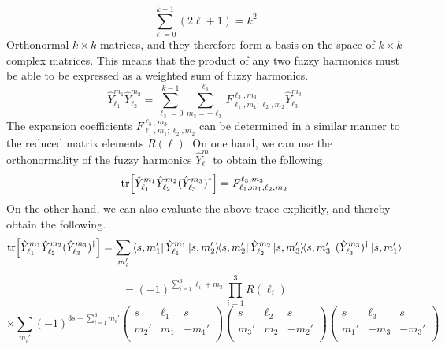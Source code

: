 %
%
\begin{equation}
\sum_{\ell=0}^{k-1} (2 \ell + 1) = k^2
\end{equation}
%
%
Orthonormal $k \times k$ matrices, and they therefore form a basis on the space of $k \times k$ complex matrices. This means that the product of any two fuzzy harmonics must be able to be expressed as a weighted sum of fuzzy harmonics.
%
%
\begin{equation}\label{fuzzy harmonic expansion}
\hat{Y}^{m_1}_{\ell_1}
\hat{Y}^{m_2}_{\ell_2}
=
\sum_{\ell_3 = 0}^{k-1}
\sum_{m_3 = -\ell_3}^{\ell_3}
F^{\ell_3, m_3}_{\ell_1, m_1; \ell_2, m_2}
\hat{Y}^{m_3}_{\ell_3}
\end{equation}
%
%
The expansion coefficients $F^{\ell_3, m_3}_{\ell_1, m_1; \ell_2, m_2}$ can be determined in a similar manner to the reduced matrix elements $R(\ell)$. On one hand, we can use the orthonormality of the fuzzy harmonics $\hat{Y}^m_\ell$ to obtain the following.
%
%
\begin{equation}
\tr[
\hat{Y}^{m_1}_{\ell_1}
\hat{Y}^{m_2}_{\ell_2}
(\hat{Y}^{m_3}_{\ell_3})^{\dagger}
]
=
F^{\ell_3, m_3}_{\ell_1, m_1; \ell_2, m_2}
\end{equation}
%
%
On the other hand, we can also evaluate the above trace explicitly, and thereby obtain the following.
%
%
\begin{equation*}
\tr[
\hat{Y}^{m_1}_{\ell_1}
\hat{Y}^{m_2}_{\ell_2}
(\hat{Y}^{m_3}_{\ell_3})^{\dagger}
]
=
\sum_{m_i'}
\bra{s, m_1'}
\hat{Y}^{m_1}_{\ell_1}
\ketbra{s,m_2'}{s,m_2'}
\hat{Y}^{m_2}_{\ell_2}
\ketbra{s,m_3'}{s,m_3'}
(\hat{Y}^{m_3}_{\ell_3})^{\dagger}
\ket{s,m_1'}
\end{equation*}
%
%
\begin{equation*}
=
(-1)^{\sum_{i=1}^3 \ell_i + m_3} \, \prod_{i=1}^3 R(\ell_i)
\end{equation*}
%
%
\begin{equation*}
\times
\sum_{m_i'}
(-1)^{3s + \sum_{i=1}^3 m_i'}
\left( \begin{array}{ccc}
s & \ell_1 & s \\
m_2' & m_1 & -m_1' \\
\end{array} \right)
\left( \begin{array}{ccc}
s & \ell_2 & s \\
m_3' & m_2 & -m_2' \\
\end{array} \right)
\left( \begin{array}{ccc}
s & \ell_3 & s \\
m_1' & -m_3 & -m_3' \\
\end{array} \right)
\end{equation*}
